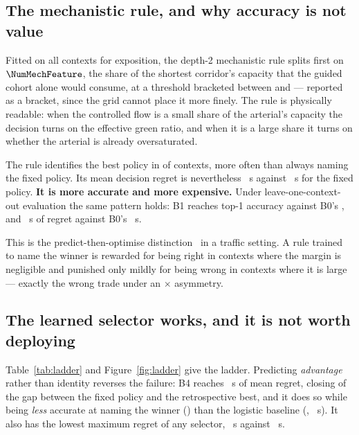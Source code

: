 \subsection{The mechanistic rule, and why accuracy is not value}

Fitted on all contexts for exposition, the depth-2 mechanistic rule splits
first on $\NumMechFeature$, the share of the shortest corridor's capacity that
the guided cohort alone would consume, at a threshold bracketed between
\NumMechBracketLo{} and \NumMechBracketHi{} --- reported as a bracket, since
the grid cannot place it more finely. The rule is physically readable: when the
controlled flow is a small share of the arterial's capacity the decision turns
on the effective green ratio, and when it is a large share it turns on whether
the arterial is already oversaturated.

The rule identifies the best policy in \NumMechTopOne{} of contexts, more often
than always naming the fixed policy. Its mean decision regret is nevertheless
\NumMechRegret~s against \NumMechFixedRegret~s for the fixed policy.
\textbf{It is more accurate and more expensive.} Under leave-one-context-out
evaluation the same pattern holds: B1 reaches \NumBOneTopOne{} top-1 accuracy
against B0's \NumBZeroTopOne{}, and \NumBOneRegret~s of regret against B0's
\NumBZeroRegret~s.

This is the predict-then-optimise distinction~\cite{elmachtoub2022spo} in a
traffic setting. A rule trained to name the winner is rewarded for being right
in contexts where the margin is negligible and punished only mildly for being
wrong in contexts where it is large --- exactly the wrong trade under an
\NumAsymRatio$\times$ asymmetry.

\subsection{The learned selector works, and it is not worth deploying}

Table~\ref{tab:ladder} and Figure~\ref{fig:ladder} give the ladder. Predicting
\emph{advantage} rather than identity reverses the failure: B4 reaches
\NumBFourRegret~s of mean regret, closing \NumBFourGapClosed{} of the gap
between the fixed policy and the retrospective best, and it does so while being
\emph{less} accurate at naming the winner (\NumBFourTopOne{}) than the logistic
baseline (\NumBThreeTopOne{}, \NumBThreeRegret~s). It also has the lowest
maximum regret of any selector, \NumBFourMax~s against \NumBZeroMax~s.

